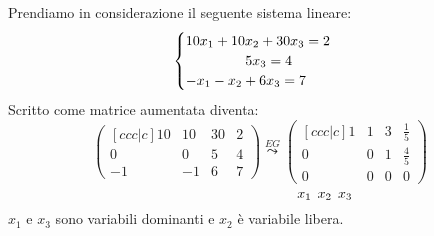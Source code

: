 \documentclass[a4paper]{article}
\theoremstyle{break}
\theoremstyle{break}
\theoremstyle{break}
\theoremstyle{break}
\begin{document}
\begin{example}
	Prendiamo in considerazione il seguente sistema lineare:
	\[
		\begin{cases}
			10x_1 + 10x_2 + 30x_3 = 2 \\
			\hspace{1.5cm} 5x_3 = 4   \\
			-x_1 - x_2 + 6x_3 = 7
		\end{cases}
	\]
	Scritto come matrice aumentata diventa:
	\[
		\begin{pmatrix}[ccc|c]
			10 & 10 & 30 & 2 \\
			0  & 0  & 5  & 4 \\
			-1 & -1 & 6  & 7
		\end{pmatrix}
		\stackrel{EG}{\leadsto}
		\begin{pmatrix}[ccc|c]
			1 & 1 & 3 & \frac{1}{5} \\
			0 & 0 & 1 & \frac{4}{5} \\
			0 & 0 & 0 & 0
		\end{pmatrix}
	\]
	\[
		\hspace{3.3cm} x_1 \;\, x_2 \;\, x_3
	\]
	\( x_1 \) e \( x_3 \) sono variabili dominanti e \( x_2 \) è variabile libera.
\end{example}
\end{document}

